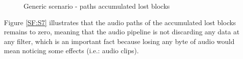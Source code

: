 \begin{figure}[!htb]
  \begin{center}
    \begin{subfigmatrix}{2}
    \end{subfigmatrix}
    \caption{Generic scenario - paths accumulated lost blocks}
    \label{F:gsalb}
  \end{center}
\end{figure}

\vbox{Figure \ref{SF:S7} illustrates that the audio paths of the accumulated lost blocks remains to zero, meaning that the audio pipeline is not discarding any data at any filter, which is an important fact because losing any byte of audio would mean noticing some effects (i.e.: audio clips).} 

